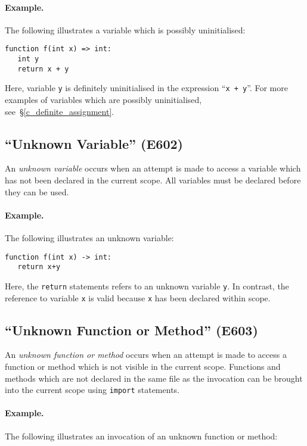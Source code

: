 \paragraph{Example.}  The following illustrates a variable which is possibly uninitialised:

\begin{lstlisting}
function f(int x) => int:
   int y
   return x + y
\end{lstlisting}

Here, variable \lstinline{y} is definitely uninitialised in the expression ``\lstinline{x + y}''.  For more examples of variables which are possibly uninitialised, see~\S\ref{c_definite_assignment}.

\subsection{``Unknown Variable'' (E602)}

An {\em unknown variable} occurs when an attempt is made to access a variable which has not been declared in the current scope.  All variables must be declared before they can be used.

\paragraph{Example.}  The following illustrates an unknown variable:

\begin{lstlisting}
function f(int x) -> int:
   return x+y
\end{lstlisting}

Here, the \lstinline{return} statements refers to an unknown variable \lstinline{y}.  In contrast, the reference to variable \lstinline{x} is valid because \lstinline{x} has been declared within scope.

\subsection{``Unknown Function or Method'' (E603)}

An {\em unknown function or method} occurs when an attempt is made to access a function or method which is not visible in the current scope.  Functions and methods which are not declared in the same file as the invocation can be brought into the current scope using \lstinline{import} statements.  
\paragraph{Example.}  The following illustrates an invocation of an unknown function or method:

